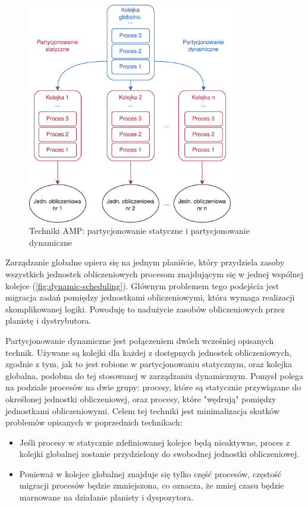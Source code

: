 \documentclass[../../main]{subfiles}
\begin{document}
\begin{figure}[ht]
    \centering
    \includegraphics[width=0.80\textwidth]{Images/static-semistatic.png}
    \caption{Techniki AMP: partycjonowanie statyczne i partycjonowanie dynamiczne}
    \label{fig:static-semistatic}
\end{figure}

Zarządzanie globalne opiera się na jednym planiście, który przydziela zasoby wszystkich jednostek obliczeniowych procesom znajdującym się w jednej wspólnej kolejce (\cref{fig:dynamic-scheduling}). Głównym problemem tego podejścia jest migracja zadań pomiędzy jednostkami obliczeniowymi, która wymaga realizacji skomplikowanej logiki. Powoduję to nadużycie zasobów obliczeniowych przez planistę i dystrybutora.

Partycjonowanie dynamiczne jest połączeniem dwóch wcześniej opisanych technik. Używane są kolejki dla każdej z dostępnych jednostek obliczeniowych, zgodnie z tym, jak to jest robione w partycjonowaniu statycznym, oraz kolejka globalna, podobna do tej stosowanej w zarządzaniu dynamicznym. Pomysł polega na podziale procesów na dwie grupy: procesy, które są statycznie przywiązane do określonej jednostki obliczeniowej, oraz procesy, które "wędrują" pomiędzy jednostkami obliczeniowymi. Celem tej techniki jest minimalizacja skutków problemów opisanych w poprzednich technikach:

\begin{itemize}
    \item Jeśli procesy w statycznie zdefiniowanej kolejce będą nieaktywne, proces z kolejki globalnej zostanie przydzielony do swobodnej jednostki obliczeniowej.
    \item Ponieważ w kolejce globalnej znajduje się tylko część procesów, częstość migracji procesów będzie zmniejszona, co oznacza, że mniej czasu będzie marnowane na działanie planisty i dyspozytora.
\end{itemize}
\end{document}
